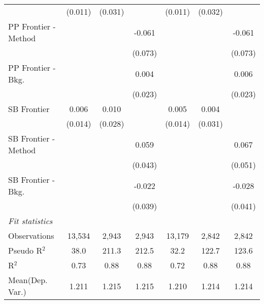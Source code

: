 \begin{tabular}{lcccccc}
                        & (0.011)       & (0.031) &             & (0.011)       & (0.032) &   \\   
   PP Frontier - Method &               &         & -0.061      &               &         & -0.061\\   
                        &               &         & (0.073)     &               &         & (0.073)\\   
   PP Frontier - Bkg.   &               &         & 0.004       &               &         & 0.006\\   
                        &               &         & (0.023)     &               &         & (0.023)\\   
   SB Frontier          & 0.006         & 0.010   &             & 0.005         & 0.004   &   \\   
                        & (0.014)       & (0.028) &             & (0.014)       & (0.031) &   \\   
   SB Frontier - Method &               &         & 0.059       &               &         & 0.067\\   
                        &               &         & (0.043)     &               &         & (0.051)\\   
   SB Frontier - Bkg.   &               &         & -0.022      &               &         & -0.028\\   
                        &               &         & (0.039)     &               &         & (0.041)\\   
   \midrule
   \emph{Fit statistics}\\
   Observations         & 13,534        & 2,943   & 2,943       & 13,179        & 2,842   & 2,842\\  
   Pseudo R$^2$         & 38.0          & 211.3   & 212.5       & 32.2          & 122.7   & 123.6\\  
   R$^2$                & 0.73          & 0.88    & 0.88        & 0.72          & 0.88    & 0.88\\  
Mean(Dep. Var.) & 1.211 & 1.215 & 1.215 & 1.210 & 1.214 & 1.214 \\
   

\end{tabular}
